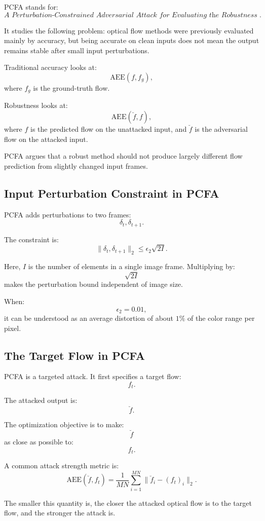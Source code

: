 \documentclass{article}
\begin{document}
PCFA stands for:
\[
\textit{A Perturbation-Constrained Adversarial Attack for Evaluating the Robustness of Optical Flow}.
\]

It studies the following problem: optical flow methods were previously evaluated mainly by accuracy, but being accurate on clean inputs does not mean the output remains stable after small input perturbations.

Traditional accuracy looks at:
\[
\mathrm{AEE}(f,f_g),
\]
where \(f_g\) is the ground-truth flow.

Robustness looks at:
\[
\mathrm{AEE}(\breve f,f),
\]
where \(f\) is the predicted flow on the unattacked input, and \(\breve f\) is the adversarial flow on the attacked input.

PCFA argues that a robust method should not produce largely different flow prediction from slightly changed input frames.

\subsection{Input Perturbation Constraint in PCFA}

PCFA adds perturbations to two frames:
\[
\delta_t,\delta_{t+1}.
\]

The constraint is:
\[
\|\delta_t,\delta_{t+1}\|_2
\leq
\epsilon_2\sqrt{2I}.
\]

Here, \(I\) is the number of elements in a single image frame. Multiplying by:
\[
\sqrt{2I}
\]
makes the perturbation bound independent of image size.

When:
\[
\epsilon_2=0.01,
\]
it can be understood as an average distortion of about \(1\%\) of the color range per pixel.

\subsection{The Target Flow in PCFA}

PCFA is a targeted attack. It first specifies a target flow:
\[
f_t.
\]

The attacked output is:
\[
\breve f.
\]

The optimization objective is to make:
\[
\breve f
\]
as close as possible to:
\[
f_t.
\]

A common attack strength metric is:
\[
\mathrm{AEE}(\breve f,f_t)
=
\frac{1}{MN}
\sum_{i=1}^{MN}
\|\breve f_i-(f_t)_i\|_2.
\]

The smaller this quantity is, the closer the attacked optical flow is to the target flow, and the stronger the attack is.
\end{document}
